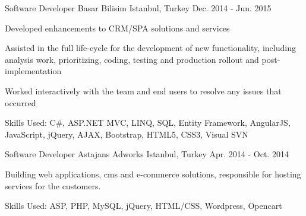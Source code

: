 \begin{cventries}
  \cventry
    {Software Developer} %
    {Basar Bilisim} %
    {Istanbul, Turkey} %
    {Dec. 2014 - Jun. 2015} %
    {
      \begin{cvitems} %
        \item {Developed enhancements to CRM/SPA solutions and services}
        \item {Assisted in the full life-cycle for the development of new functionality, including analysis work, prioritizing, coding, testing and production rollout and post-implementation}
        \item {Worked interactively with the team and end users to resolve any issues that occurred}
        \item {Skills Used: C\#, ASP.NET MVC, LINQ, SQL, Entity Framework, AngularJS, JavaScript, jQuery, AJAX, Bootstrap, HTML5, CSS3, Visual SVN}
      \end{cvitems}
    }

  \cventry
    {Software Developer} %
    {Astajans Adworks} %
    {Istanbul, Turkey} %
    {Apr. 2014 - Oct. 2014} %
    {
      \begin{cvitems} %
        \item {Building web applications, cms and e-commerce solutions, responsible for hosting services for the customers.}
        \item {Skills Used: ASP, PHP, MySQL, jQuery, HTML/CSS, Wordpress, Opencart}
      \end{cvitems}
    }


\end{cventries}
